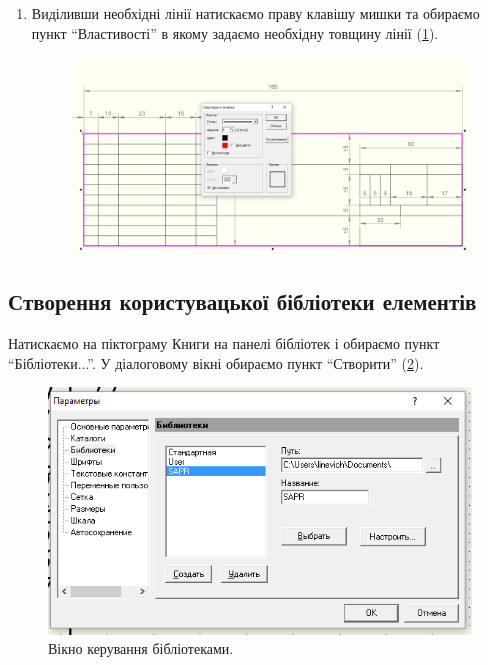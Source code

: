 \begin{enumerate}[leftmargin=*]
\item  Виділивши необхідні лінії натискаємо праву клавішу мишки та обираємо пункт ``Властивості'' в
  якому задаємо необхідну товщину лінії (\ref{fig:lab2:tenth_step}).
  \begin{figure}[!htb]
    \centering \includegraphics[width=0.9\linewidth]{./images/lab2/bold_line.png}
    \caption{\label{fig:lab2:tenth_step}}
  \end{figure}
  \FloatBarrier
  
\end{enumerate}

\subsection{Створення користувацької бібліотеки елементів}

Натискаємо на піктограму Книги на панелі бібліотек і обираємо пункт ``Бібліотеки...''. У діалоговому
вікні обираємо пункт ``Створити'' (\ref{fig:lab2:create_library}).
\begin{figure}[!htb]
  \centering \includegraphics[width=0.9\linewidth]{./images/lab2/new_library.png}
  \caption{Вікно керування бібліотеками.}
  \label{fig:lab2:create_library}
\end{figure}
\FloatBarrier
\newpage\restoregeometry\BorderText\BgThispage
